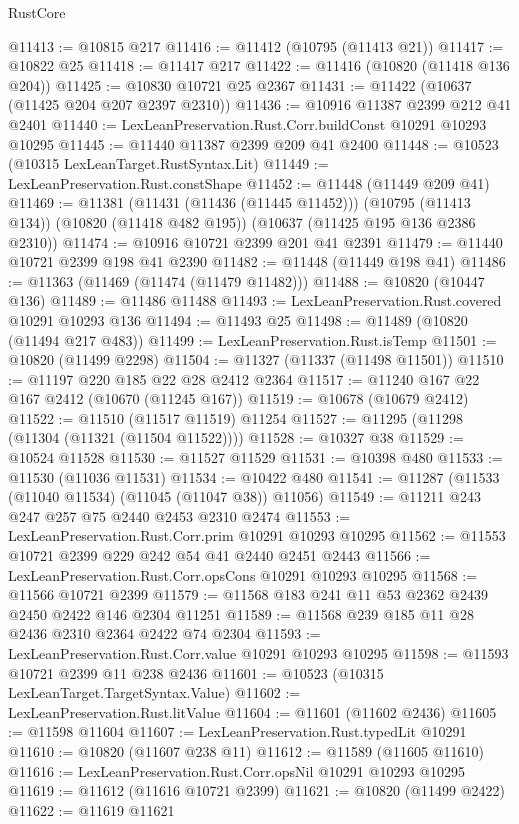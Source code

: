 \begin{lexlean}{RustCore}
\begin{coremodule}
@11413 := @10815 @217
@11416 := @11412 (@10795 (@11413 @21))
@11417 := @10822 @25
@11418 := @11417 @217
@11422 := @11416 (@10820 (@11418 @136 @204))
@11425 := @10830 @10721 @25 @2367
@11431 := @11422 (@10637 (@11425 @204 @207 @2397 @2310))
@11436 := @10916 @11387 @2399 @212 @41 @2401
@11440 := LexLeanPreservation.Rust.Corr.buildConst @10291 @10293 @10295
@11445 := @11440 @11387 @2399 @209 @41 @2400
@11448 := @10523 (@10315 LexLeanTarget.RustSyntax.Lit)
@11449 := LexLeanPreservation.Rust.constShape
@11452 := @11448 (@11449 @209 @41)
@11469 := @11381
    (@11431 (@11436 (@11445 @11452)))
    (@10795 (@11413 @134))
    (@10820 (@11418 @482 @195))
    (@10637 (@11425 @195 @136 @2386 @2310))
@11474 := @10916 @10721 @2399 @201 @41 @2391
@11479 := @11440 @10721 @2399 @198 @41 @2390
@11482 := @11448 (@11449 @198 @41)
@11486 := @11363 (@11469 (@11474 (@11479 @11482)))
@11488 := @10820 (@10447 @136)
@11489 := @11486 @11488
@11493 := LexLeanPreservation.Rust.covered @10291 @10293 @136
@11494 := @11493 @25
@11498 := @11489 (@10820 (@11494 @217 @483))
@11499 := LexLeanPreservation.Rust.isTemp
@11501 := @10820 (@11499 @2298)
@11504 := @11327 (@11337 (@11498 @11501))
@11510 := @11197 @220 @185 @22 @28 @2412 @2364
@11517 := @11240 @167 @22 @167 @2412 (@10670 (@11245 @167))
@11519 := @10678 (@10679 @2412)
@11522 := @11510 (@11517 @11519) @11254
@11527 := @11295 (@11298 (@11304 (@11321 (@11504 @11522))))
@11528 := @10327 @38
@11529 := @10524 @11528
@11530 := @11527 @11529
@11531 := @10398 @480
@11533 := @11530 (@11036 @11531)
@11534 := @10422 @480
@11541 := @11287 (@11533 (@11040 @11534) (@11045 (@11047 @38)) @11056)
@11549 := @11211 @243 @247 @257 @75 @2440 @2453 @2310 @2474
@11553 := LexLeanPreservation.Rust.Corr.prim @10291 @10293 @10295
@11562 := @11553 @10721 @2399 @229 @242 @54 @41 @2440 @2451 @2443
@11566 := LexLeanPreservation.Rust.Corr.opsCons @10291 @10293 @10295
@11568 := @11566 @10721 @2399
@11579 := @11568 @183 @241 @11 @53 @2362 @2439 @2450 @2422 @146 @2304 @11251
@11589 := @11568 @239 @185 @11 @28 @2436 @2310 @2364 @2422 @74 @2304
@11593 := LexLeanPreservation.Rust.Corr.value @10291 @10293 @10295
@11598 := @11593 @10721 @2399 @11 @238 @2436
@11601 := @10523 (@10315 LexLeanTarget.TargetSyntax.Value)
@11602 := LexLeanPreservation.Rust.litValue
@11604 := @11601 (@11602 @2436)
@11605 := @11598 @11604
@11607 := LexLeanPreservation.Rust.typedLit @10291
@11610 := @10820 (@11607 @238 @11)
@11612 := @11589 (@11605 @11610)
@11616 := LexLeanPreservation.Rust.Corr.opsNil @10291 @10293 @10295
@11619 := @11612 (@11616 @10721 @2399)
@11621 := @10820 (@11499 @2422)
@11622 := @11619 @11621

\end{coremodule}
\end{lexlean}

